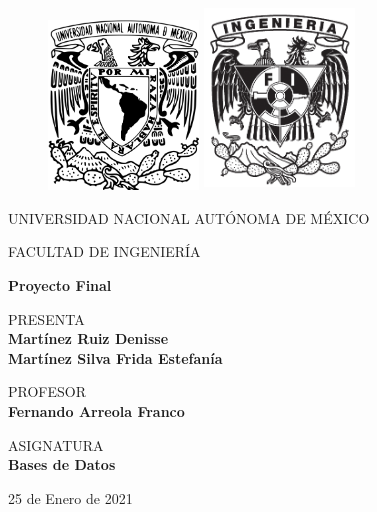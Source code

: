 \documentclass{article}
\begin{document}
\thispagestyle{empty}
	
	\begin{figure}[ht]
			\includegraphics[width=4cm]{Logo_UNAM.png}
			\label{EscudoUNAM}
	   \endminipage
			\includegraphics[height = 4.9cm ,width=4cm]{escudofi_negro.jpg}
			\label{EscudoFI}
		\endminipage
	\end{figure}
	
	\begin{center}
	\vspace{0.8cm}
	\LARGE
	UNIVERSIDAD NACIONAL AUTÓNOMA DE MÉXICO 
	
	\vspace{0.8cm}
	\LARGE
	FACULTAD DE INGENIERÍA
	
	\vspace{1.7cm}	
	\Large
	\textbf{Proyecto Final}

	\vspace{1.3cm}
	\normalsize	
	PRESENTA \\
	\vspace{.3cm}
	\large
	\textbf{Martínez Ruiz Denisse \\ Martínez Silva Frida Estefanía}
	
	\vspace{1.3cm}
	\normalsize	
	PROFESOR \\
	\vspace{.3cm}
	\large
	\textbf{Fernando Arreola Franco}
	
	\vspace{1.3cm}
	\normalsize	
	ASIGNATURA \\
	\vspace{.3cm}
	\large
	\textbf{Bases de Datos}
	
	\vspace{1.3cm}
	25 de Enero de 2021
	\end{center}
	\newpage
	
\end{document}
